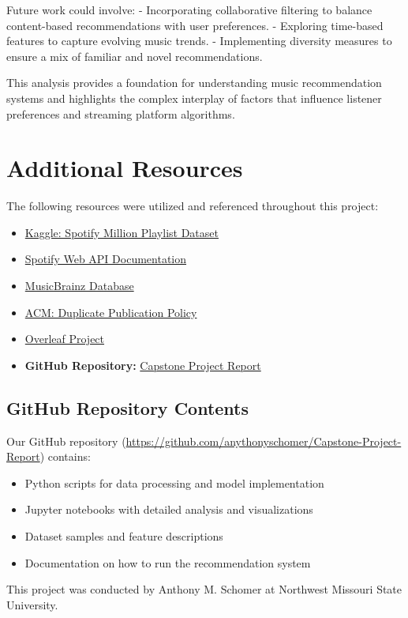 \documentclass[runningheads]{llncs}
\begin{document}
Future work could involve:
- Incorporating collaborative filtering to balance content-based recommendations with user preferences.
- Exploring time-based features to capture evolving music trends.
- Implementing diversity measures to ensure a mix of familiar and novel recommendations.

This analysis provides a foundation for understanding music recommendation systems and highlights the complex interplay of factors that influence listener preferences and streaming platform algorithms.

\section{Additional Resources}
The following resources were utilized and referenced throughout this project:

\begin{itemize}
    \item \href{https://www.kaggle.com/datasets/shubhendra/million-playlist-dataset}{Kaggle: Spotify Million Playlist Dataset}
    \item \href{https://developer.spotify.com/documentation/web-api/}{Spotify Web API Documentation}
    \item \href{https://musicbrainz.org/}{MusicBrainz Database}
    \item \href{https://www.acm.org/publications/policies/duplicate-publication}{ACM: Duplicate Publication Policy}
    \item \href{https://www.overleaf.com/project}{Overleaf Project}
    \item \textbf{GitHub Repository:} \href{https://github.com/anythonyschomer/Capstone-Project-Report}{Capstone Project Report}
\end{itemize}

\subsection{GitHub Repository Contents}
Our GitHub repository (\url{https://github.com/anythonyschomer/Capstone-Project-Report}) contains:
\begin{itemize}
    \item Python scripts for data processing and model implementation
    \item Jupyter notebooks with detailed analysis and visualizations
    \item Dataset samples and feature descriptions
    \item Documentation on how to run the recommendation system
\end{itemize}

\vspace{1em}
This project was conducted by Anthony M. Schomer at Northwest Missouri State University.
\end{document}
